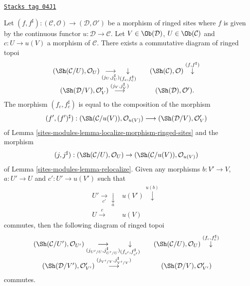 \begin{lemma}
\label{sites-modules-lemma-relocalize-morphism-ringed-sites}
\href{https://stacks.math.columbia.edu/tag/04J1}{\texttt{Stacks tag 04J1}}

Let
$(f, f^\sharp) :
(\mathcal{C}, \mathcal{O})
\longrightarrow
(\mathcal{D}, \mathcal{O}')$
be a morphism of ringed sites where $f$ is given by the continuous
functor $u : \mathcal{D} \to \mathcal{C}$.
Let $V \in \Ob(\mathcal{D})$, $U \in \Ob(\mathcal{C})$
and $c : U \to u(V)$ a morphism of $\mathcal{C}$.
There exists a commutative diagram of ringed topoi
$$
\begin{array}{ccc}(\Sh(\mathcal{C}/U), \mathcal{O}_U)
\underset{(j_U, j_U^\sharp)}{\longrightarrow}\underset{(f_c, f_c^\sharp)}{\downarrow} &  & (\Sh(\mathcal{C}), \mathcal{O}) \overset{(f, f^\sharp)}{\downarrow} \\ (\Sh(\mathcal{D}/V), \mathcal{O}'_V)
\overset{(j_V, j_V^\sharp)}{\longrightarrow} &  & (\Sh(\mathcal{D}), \mathcal{O}').\end{array}
$$
The morphism $(f_c, f_c^\sharp)$
is equal to the composition of the morphism
$$
(f', (f')^\sharp) :
(\Sh(\mathcal{C}/u(V)), \mathcal{O}_{u(V)})
\longrightarrow
(\Sh(\mathcal{D}/V), \mathcal{O}'_V)
$$
of
Lemma \ref{sites-modules-lemma-localize-morphism-ringed-sites}
and the morphism
$$
(j, j^\sharp) :
(\Sh(\mathcal{C}/U), \mathcal{O}_U)
\to
(\Sh(\mathcal{C}/u(V)), \mathcal{O}_{u(V)})
$$
of
Lemma \ref{sites-modules-lemma-relocalize}.
Given any morphisms $b : V' \to V$, $a : U' \to U$ and
$c' : U' \to u(V')$ such that
$$
\begin{array}{cc}U' \underset{c'}{\longrightarrow}\underset{a}{\downarrow} & u(V') \overset{u(b)}{\downarrow} \\ U \overset{c}{\longrightarrow} & u(V)\end{array}
$$
commutes, then the following diagram of ringed topoi
$$
\begin{array}{ccc}(\Sh(\mathcal{C}/U'), \mathcal{O}_{U'})
\underset{(j_{U'/U}, j_{U'/U}^\sharp)}{\longrightarrow}\underset{(f_{c'}, f_{c'}^\sharp)}{\downarrow} &  & (\Sh(\mathcal{C}/U), \mathcal{O}_U)
\overset{(f_c, f_c^\sharp)}{\downarrow} \\ (\Sh(\mathcal{D}/V'), \mathcal{O}'_{V'})
\overset{(j_{V'/V}, j_{V'/V}^\sharp)}{\longrightarrow} &  & (\Sh(\mathcal{D}/V), \mathcal{O}'_{V'})\end{array}
$$
commutes.
\end{lemma}

